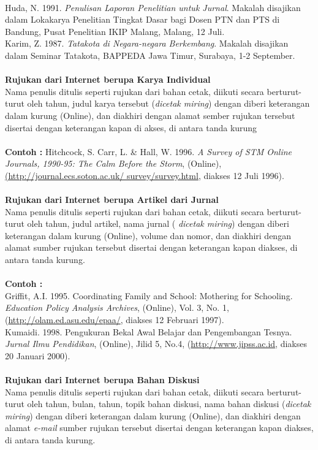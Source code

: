\\
Huda,	 N.	 1991. \textit{Penulisan	 Laporan	 Penelitian	 untuk	 Jurnal}.	 Makalah	 disajikan	 dalam	Lokakarya	Penelitian	Tingkat	Dasar	bagi	Dosen	PTN	dan	PTS	di	Bandung,	Pusat	Penelitian	IKIP	Malang,	Malang,	12	Juli. 
\\
Karim,	Z.	1987. \textit{Tatakota	di	Negara-negara	Berkembang}. Makalah	disajikan	dalam	Seminar	Tatakota,	BAPPEDA	Jawa	Timur,	Surabaya,	1-2	September.
\\
\\
\textbf{Rujukan dari Internet berupa Karya Individual}
\\
Nama	penulis	ditulis	seperti	rujukan	dari	bahan	cetak,	diikuti	secara	berturut-turut	oleh	tahun,	 judul	 karya	 tersebut	 (\textit{dicetak	 miring})	 dengan	 diberi	 keterangan	 dalam	 kurung	(Online),	dan	diakhiri	dengan	alamat	sember	rujukan	tersebut	disertai	dengan	keterangan	kapan	di	akses,	di	antara	tanda	kurung
\\
\\
\textbf{Contoh :}
Hitchcock,	S.	Carr,	L.	\&	Hall,	W.	1996. \textit{A	Survey	of	STM	Online	Journals,	1990-95:	The	Calm	
Before	 the	 Storm}, (Online),	 \url{(http://journal.ecs.soton.ac.uk/	 survey/survey.html},	 diakses	12	Juli	1996).
\\
\\
\textbf{Rujukan dari Internet berupa Artikel dari Jurnal}
\\
Nama	penulis	ditulis	seperti	rujukan	dari	bahan	cetak,	diikuti	secara	berturut-turut	oleh	tahun,	judul	artikel,	nama	jurnal	( \textit{dicetak	miring})	dengan	diberi	keterangan	dalam	kurung	
(Online),	 volume	 dan	 nomor,	 dan	 diakhiri	 dengan	 alamat	 sumber	 rujukan	 tersebut	disertai	dengan	keterangan	kapan	diakses,	di	antara	tanda	kurung.
\\
\\
\textbf{Contoh :}\\
Griffit,	 A.I.	 1995.	 Coordinating	 Family	 and	 School:	 Mothering	 for	 Schooling.	 \textit{Education	Policy	Analysis	Archives}, (Online),	Vol.	3,	No.	1,	(\url{http://olam.ed.asu.edu/epaa/}, diakses 12 Februari	1997). \\
Kumaidi.	 1998.	 Pengukuran	 Bekal	 Awal	 Belajar	 dan	 Pengembangan	 Tesnya.\textit{ Jurnal	 Ilmu	Pendidikan}, (Online),	Jilid	5,	No.4,	(\url{http://www.jipss.ac.id},	diakses	20	Januari	2000).
\\
\\
\textbf{Rujukan dari Internet berupa Bahan Diskusi}
\\
Nama	penulis	ditulis	seperti	rujukan	dari	bahan	cetak,	diikuti	secara	berturut-turut	oleh	tahun,	 bulan,	 tahun,	 topik	 bahan	 diskusi,	 nama	 bahan	 diskusi	 (\textit{dicetak	 miring})	 dengan	diberi	 keterangan	 dalam	 kurung	 (Online),	 dan	 diakhiri	 dengan	 alamat \textit{e-mail}	 sumber	rujukan	tersebut	disertai	dengan	keterangan	kapan	diakses,	di	antara	tanda	kurung.
